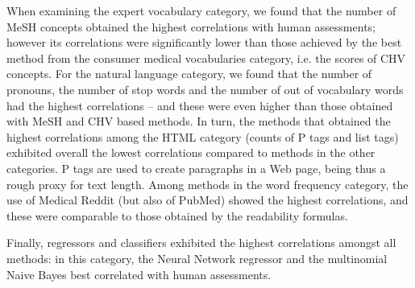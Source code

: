 When examining the expert vocabulary category, we found that the number of MeSH concepts obtained the highest correlations with human assessments; however its correlations were significantly lower than those achieved by the best method from the consumer medical vocabularies category, i.e. the scores of CHV concepts. For the natural language category, we found that the number of pronouns, the number of stop words and the number of out of vocabulary words had the highest correlations -- and these were even higher than those obtained with MeSH and CHV based methods. In turn, the methods that obtained the highest correlations among the HTML category (counts of P tags and list tags) exhibited overall the lowest correlations compared to methods in the other categories. P tags are used to create paragraphs in a Web page, being thus a rough proxy for text length. 
Among methods in the word frequency category, the use of Medical Reddit (but also of PubMed) showed the highest correlations, and these were comparable to those obtained by the readability formulas. 

Finally, regressors and classifiers exhibited the highest correlations amongst all methods: in this  category, the  Neural Network regressor and the multinomial Naive Bayes best correlated with human assessments. 



